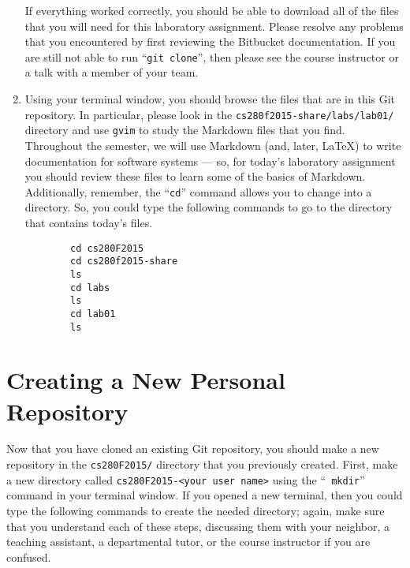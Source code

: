 \begin{enumerate}
    If everything worked correctly, you should be able to download all of the files that you will need for this
    laboratory assignment. Please resolve any problems that you encountered by first reviewing the Bitbucket
    documentation. If you are still not able to run ``{\tt git clone}'', then please see the course instructor or a
    talk with a member of your team.

  \item Using your terminal window, you should browse the files that are in this Git repository.  In particular, please
    look in the {\tt cs280f2015-share/labs/lab01/} directory and use {\tt gvim} to study the Markdown files that you
    find.  Throughout the semester, we will use Markdown (and, later, \LaTeX) to write documentation for software
    systems --- so, for today's laboratory assignment you should review these files to learn some of the basics of
    Markdown. Additionally, remember, the ``{\tt cd}'' command allows you to change into a directory. So, you could type
    the following commands to go to the directory that contains today's files.

    \vspace*{-.1in}
    \begin{verbatim}
        cd cs280F2015
        cd cs280f2015-share
        ls
        cd labs
        ls
        cd lab01
        ls
    \end{verbatim}
    \vspace*{-.5in}

    \end{enumerate}

\section*{Creating a New Personal Repository}

\begin{sloppypar}
  Now that you have cloned an existing Git repository, you should make a new repository in the {\tt cs280F2015/} directory
  that you previously created.  First, make a new directory called {\tt cs280F2015-<your user name>} using the ``{\tt
  mkdir}'' command in your terminal window. If you opened a new terminal, then you could type the following commands to
  create the needed directory; again, make sure that you understand each of these steps, discussing them with your
  neighbor, a teaching assistant, a departmental tutor, or the course instructor if you are confused.
\end{sloppypar}


